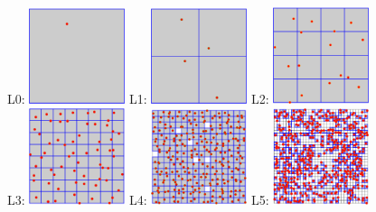 \begin{figure}[htbp!]
    \centering
    L0: \includegraphics[width=0.25\textwidth]{figures/L21/quadtreeBoxesLevel00-crop.pdf}
    L1: \includegraphics[width=0.25\textwidth]{figures/L21/quadtreeBoxesLevel01-crop.pdf}
    L2: \includegraphics[width=0.25\textwidth]{figures/L21/quadtreeBoxesLevel02-crop.pdf}\\ \vspace{8pt}
    L3: \includegraphics[width=0.25\textwidth]{figures/L21/quadtreeBoxesLevel03-crop.pdf}
    L4: \includegraphics[width=0.25\textwidth]{figures/L21/quadtreeBoxesLevel04-crop.pdf}
    L5: \includegraphics[width=0.25\textwidth]{figures/L21/quadtreeBoxesLevel05-crop.pdf}\\ \vspace{8pt}

\end{figure}
